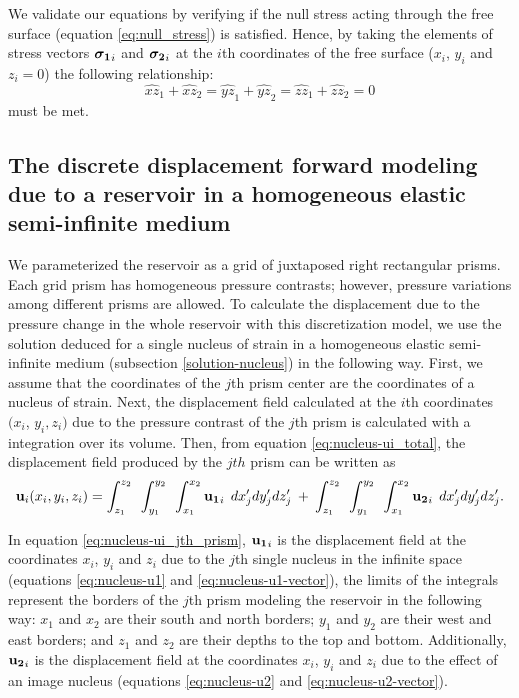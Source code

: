 \documentclass[journal abbreviation, manuscript]{copernicus}
\begin{document}
We validate our equations by verifying if the null stress acting through the free surface (equation \ref{eq:null_stress}) is satisfied.
Hence, by taking the elements of stress vectors $\mbox{\boldmath$\sigma_{1}$}_{i}$ and 
$\mbox{\boldmath$\sigma_{2}$}_{i}$  at the $i$th coordinates of the free surface ($x_i$, $y_i$ and $z_i = 0$) the following relationship:
\begin{equation}
{\widehat{xz}_{1}} + {\widehat{xz}_{2}} 
= {\widehat{yz}_{1}} + {\widehat{yz}_{2}}
= {\widehat{zz}_{1}} + {\widehat{zz}_{2}}  
= 0
\label{eq:null_stress_i}
\end{equation}
must be met.


\subsection{The discrete displacement forward modeling due to a reservoir in a homogeneous elastic semi-infinite medium} \label{u-model}


We parameterized the reservoir as a grid of juxtaposed right rectangular prisms.
Each grid prism has homogeneous pressure contrasts; however, pressure variations among different prisms are allowed. 
To calculate the displacement due to the pressure change in the whole reservoir with this discretization model, we use the solution deduced for a single nucleus of strain in a homogeneous elastic semi-infinite medium (subsection \ref{solution-nucleus}) in the following way. 
First, we assume that the coordinates of the $j$th prism center are the coordinates of a nucleus of strain.
Next, the displacement field calculated at the $i$th coordinates  $(x_i$, $y_i, z_i)$  due to the pressure contrast of the $j$th prism is calculated with a integration over its volume.
Then, from equation \ref{eq:nucleus-ui_total}, the displacement field produced by the $jth$ prism can be written as 
\begin{equation}
{\bf{u}}_{i} (x_i,y_i,z_i) =  
\int_{z_1}^{z_2} \:\:
\int_{y_1}^{y_2} \:\: 
\int_{x_1}^{x_2} 
{\bf{u_{1}}}_{i} \: \:  dx^{\prime}_j dy^{\prime}_j dz^{\prime}_j 
\: + \:
\int_{z_1}^{z_2} \:\:
\int_{y_1}^{y_2} \:\: 
\int_{x_1}^{x_2} 
{\bf{u_{2}}}_{i} \:\:  dx^{\prime}_j dy^{\prime}_j dz^{\prime}_j.
\label{eq:nucleus-ui_jth_prism}
\end{equation}

In equation \ref{eq:nucleus-ui_jth_prism},  ${\bf{u_{1}}}_{i}$ is the displacement field at the coordinates $x_i$, $y_i$  and $z_i$  due to the $j$th single nucleus in the infinite space (equations \ref{eq:nucleus-u1} and  \ref{eq:nucleus-u1-vector}), the limits of the integrals represent the borders of the $j$th prism modeling the reservoir in the following way: $x_1$ and $x_2$ are their south and north borders; $y_1$ and  $y_2$ are their  west and east borders;  and $z_1$ and $z_2$ are their depths to the top and bottom.
Additionally, ${\bf{u_{2}}}_{i}$ is the displacement field at the coordinates $x_i$, $y_i$  and $z_i$  due to the effect of an image nucleus (equations \ref{eq:nucleus-u2} and  \ref{eq:nucleus-u2-vector}). 
 
\end{document}
